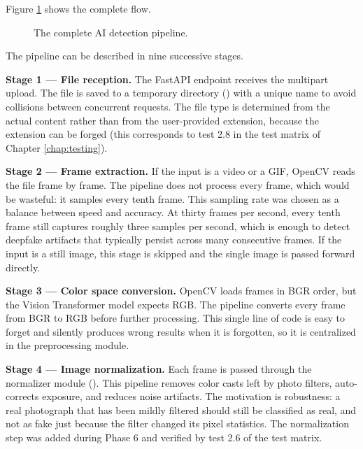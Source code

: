Figure \ref{fig:pipeline} shows the complete flow.

\begin{figure}[H]
\centering
{}
\caption{The complete AI detection pipeline.}
\label{fig:pipeline}
\end{figure}

The pipeline can be described in nine successive stages.

\noindent\textbf{Stage 1 --- File reception.} The FastAPI endpoint  receives the multipart upload. The file is saved to a temporary directory () with a unique name to avoid collisions between concurrent requests. The file type is determined from the actual content rather than from the user-provided extension, because the extension can be forged (this corresponds to test 2.8 in the test matrix of Chapter \ref{chap:testing}).

\noindent\textbf{Stage 2 --- Frame extraction.} If the input is a video or a GIF, OpenCV reads the file frame by frame. The pipeline does not process every frame, which would be wasteful: it samples every tenth frame. This sampling rate was chosen as a balance between speed and accuracy. At thirty frames per second, every tenth frame still captures roughly three samples per second, which is enough to detect deepfake artifacts that typically persist across many consecutive frames. If the input is a still image, this stage is skipped and the single image is passed forward directly.

\noindent\textbf{Stage 3 --- Color space conversion.} OpenCV loads frames in BGR order, but the Vision Transformer model expects RGB. The pipeline converts every frame from BGR to RGB before further processing. This single line of code is easy to forget and silently produces wrong results when it is forgotten, so it is centralized in the preprocessing module.

\noindent\textbf{Stage 4 --- Image normalization.} Each frame is passed through the normalizer module (). This pipeline removes color casts left by photo filters, auto-corrects exposure, and reduces noise artifacts. The motivation is robustness: a real photograph that has been mildly filtered should still be classified as real, and not as fake just because the filter changed its pixel statistics. The normalization step was added during Phase 6 and verified by test 2.6 of the test matrix.

